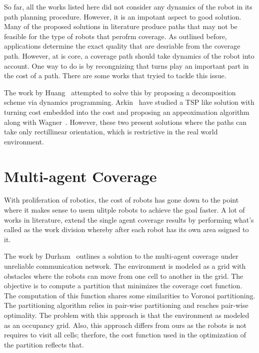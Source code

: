 \documentclass[../main.tex]{subfiles}
\begin{document}
So far, all the works listed here did not consider any dynamics of the robot in its path planning procedure. However, it is an impotant aspect to good solution. Many of the proposed solutions in literature produce paths that may not be feasible for the type of robots that perofrm coverage. As outlined before, applications determine the exact quality that are desriable from the coverage path. However, at is core, a coverage path should take dynamics of the robot into account. One way to do is by recongnizing that turns play an important part in the cost of a path. There are some works that tryied to tackle this issue.

The work by Huang~\cite{Huang2001optimal} attempted to solve this by proposing a decomposition scheme via dynamics programming. Arkin~\cite{arkin2005optimal} have studied a TSP like solution with turning cost embedded into the cost and proposing an appeoximation algorithm along with Wagner~\cite{wagner2001approximation}. However, these two present solutions where the paths can take only rectillinear orientation, which is restrictive in the real world environment.


\section{Multi-agent Coverage}
\label{section:multi_agent_coverage_lit_review}

With proliferation of robotics, the cost of robots has gone down to the point where it makes sense to usem ulitple robots to achieve the goal faster. A lot of works in literature, extend the single agent coverage results by performing what's called as the work division whereby after each robot has its own area ssigned to it.

The work by Durham~\cite{durham2012discrete} outlines a solution to the  multi-agent coverage under unreliable communication network. The environment is modeled as a grid with obstacles where the robots can move from one cell to another in the grid. The objective is to compute a partition that minimizes the coverage cost function. The computation of this function shares some similarities to Voronoi partitioning. The partitioning algorithm relies in pair-wise partitioning and reaches pair-wise optimality. The problem with this approach is that the environment as modeled as an occupancy grid. Also, this approach differs from ours as the robots is not requires to visit all cells; therfore, the cost function used in the optimization of the partition reflects that.
\end{document}
